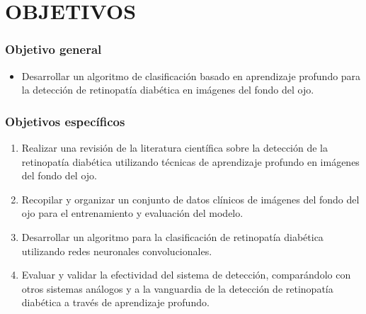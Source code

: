
\chapter{OBJETIVOS} \label{chap:objetivos}

\subsection*{Objetivo general}

\begin{itemize}

    \item Desarrollar un algoritmo de clasificación basado en aprendizaje profundo para la
    detección de retinopatía diabética en imágenes del fondo del ojo.
    
\end{itemize}

\subsection*{Objetivos específicos}


\begin{enumerate}

    \item Realizar una revisión de la literatura científica sobre la detección de la
    retinopatía diabética utilizando técnicas de aprendizaje profundo en imágenes del
    fondo del ojo.

    \item Recopilar y organizar un conjunto de datos clínicos de imágenes del fondo del
    ojo para el entrenamiento y evaluación del modelo.

    \item Desarrollar un algoritmo para la clasificación de retinopatía diabética
    utilizando redes neuronales convolucionales.

    \item Evaluar y validar la efectividad del sistema de detección, comparándolo con
    otros sistemas análogos y a la vanguardia de la detección de retinopatía diabética a
    través de aprendizaje profundo.

\end{enumerate}

